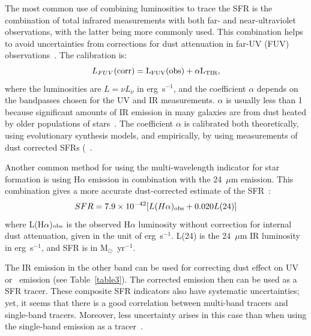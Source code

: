 The most common use of combining luminosities to trace the SFR is the combination of total infrared measurements with both far- and near-ultraviolet observations, with the latter being more commonly used. 
This combination helps to avoid uncertainties from corrections for dust attenuation in far-UV (FUV) observations~\citep[e.g.][]{Hao11}. The calibration is:
\begin{equation}
L_{FUV}(\rm corr) = L_{FUV}(\rm obs) + \alpha L_{\rm TIR},
\end{equation}
where the luminosities are $L = \nu L_{\nu}$ in erg~s$^{-1}$, and the coefficient $\alpha$ depends on the bandpasses chosen for the UV and IR measurements. $\alpha$ is usually less than 1 because significant amounts of IR emission in many galaxies are from dust heated by older populations of stars~\citep{Kennicutt12}. The coefficient $\alpha$ is calibrated both theoretically, using evolutionary synthesis models, and empirically, by using measurements of dust corrected SFRs (~\citep[e.p][]{Hao11, Leroy08}. 

Another common method for using the multi-wavelength indicator for star formation is using H${\alpha}$ emission in combination with the 24~$\mu$m emission. 
This combination gives a more accurate dust-corrected estimate of the SFR~\citep{Kennicutt09}:
\begin{equation} 
\label{equ: halphaplus24}
SFR = 7.9 \times 10^{-42}[L(H{\alpha})_{\rm obs} + 0.020L(24)]
\end{equation}
where L(H${\alpha}$)$_{\rm obs}$ is the observed H${\alpha}$ luminosity without correction for internal dust attenuation, given in the unit of erg~s$^{-1}$. 
L(24) is the 24~$\mu$m IR luminosity in erg~s$^{-1}$, and SFR is in M$_{\odot}$~yr$^{-1}$.


The IR emission in the other band can be used for correcting dust effect on UV or \halpha~emission (see Table~\ref{table3}). 
The corrected emission then can be used as a SFR tracer.
These composite SFR indicators also have systematic uncertainties; yet, it seems that there is a good correlation between multi-band tracers and single-band tracers. 
Moreover, less uncertainty arises in this case than when using the single-band emission as a tracer~\citep{Kennicutt09}. 

